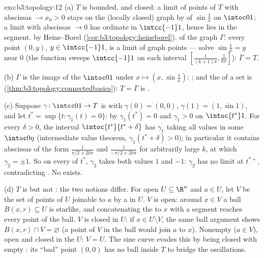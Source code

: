 \begin{solution}{exo:b3:topology:12}
(a) $T$ is bounded, and closed: a limit of points of $T$
with abscissas $\to x_0 > 0$ stays on the (locally closed)
graph by  of $\sin\frac1x$ on $\intoc01$; a limit
with abscissas $\to 0$ has ordinate in $\intcc{-1}1$, hence
lies in the segment.  by Heine--Borel
(\cref{cor:b3:topology:heineborel}).  of the graph
$\Gamma$: every point $(0, y)$, $y \in \intcc{-1}1$, is a
limit of graph points --- solve $\sin\frac1x = y$ near $0$
(the function sweeps $\intcc{-1}1$ on each interval
$[\frac1{(k+1)\pi}, \frac1{k\pi}]$): $\bar\Gamma = T$.

(b) $\Gamma$ is the  image of the 
$\intoc01$ under $x \mapsto (x, \sin\frac1x)$: ;
and the  of a  set is 
(\cref{thm:b3:topology:connectedbasics}): $T = \bar\Gamma$
is .

(c) Suppose $\gamma\colon\intcc01\to T$ is  with
$\gamma(0) = (0,0)$, $\gamma(1) = (1, \sin1)$, and let $t^*
= \sup\{t : \gamma_1(t) = 0\}$: by  $\gamma_1(t^*)
= 0$ and $\gamma_1 > 0$ on $\intoc{t^*}1$. For every
$\delta > 0$, the interval $\intoc{t^*}{t^*+\delta}$ has
$\gamma_1$ taking all values in some $\intoc0\eta$
(intermediate value theorem, $\gamma_1(t^* + \delta) > 0$);
in particular it contains abscissas of the form
$\frac1{\pi/2 + 2k\pi}$ and $\frac1{-\pi/2 + 2k\pi}$ for
arbitrarily large $k$, at which $\gamma_2 = \pm1$. So on
every  of $t^*$, $\gamma_2$ takes both
values $1$ and $-1$: $\gamma_2$ has no limit at $t^{*+}$,
contradicting . No  exists.

(d) $T$ is  but not : the two notions
differ. For open $U \subseteq \R^n$  and $a \in U$,
let $V$ be the set of points of $U$ joinable to $a$ by a
 in $U$. $V$ is open: around $x \in V$ a ball $B(x, r)
\subseteq U$ is starlike, and concatenating the  to $x$
with a segment reaches every point of the ball. $V$ is
closed in $U$: if $x \in U \setminus V$, the same ball
argument shows $B(x, r) \cap V = \varnothing$ (a point of
$V$ in the ball would join $a$ to $x$). Nonempty ($a \in
V$), open and closed in the  $U$: $V = U$. The sine
curve evades this by being closed with empty : its
``bad'' point $(0,0)$ has no ball inside $T$ to bridge the
oscillations.
\end{solution}

